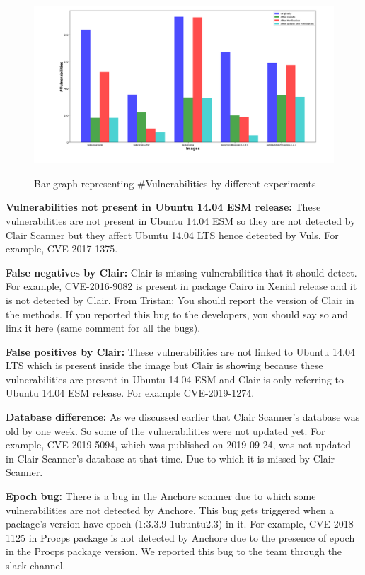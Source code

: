 \documentclass[a4paper,num-refs]{oup-contemporary}
\newcommand{\tristan}[1]{\color{blue}From Tristan: #1\color{black}}
\begin{document}
\begin{figure}[b]
        {\includegraphics[scale=1.5,width=\textwidth]
        {Figures/bargraph.png}}
        \caption{\label{fig:bargraph} Bar graph representing \#Vulnerabilities by different experiments}
      \end{figure}
\textbf{Vulnerabilities not present in Ubuntu 14.04 ESM release:} These vulnerabilities are not present in Ubuntu 14.04 ESM so they 
are not detected by Clair Scanner but they affect Ubuntu 14.04 LTS hence detected by Vuls. For example, CVE-2017-1375.

\textbf{False negatives by Clair:} Clair is missing vulnerabilities that it should detect. For example, CVE-2016-9082 
is present in package Cairo in Xenial release and it is not detected by Clair. \tristan{You should report the version of Clair in 
the methods. If you reported this bug to the developers, you should say so and link it here (same comment for all the bugs).}

\textbf{False positives by Clair:} These vulnerabilities are not linked to Ubuntu 14.04 LTS which is 
present inside the image but Clair is showing because these vulnerabilities are present in Ubuntu 14.04 ESM and 
Clair is only referring to Ubuntu 14.04 ESM release. For example CVE-2019-1274.

\textbf{Database difference:} As we discussed earlier that Clair Scanner's database was old by one week.
                So some of the vulnerabilities were not updated yet. For example, CVE-2019-5094, which
		was published on 2019-09-24, was not 
		updated in Clair Scanner's database at that time. Due to which it is missed by Clair Scanner.


\textbf{Epoch bug:} There is a bug in the Anchore scanner due to which some vulnerabilities are 
		not detected by Anchore. This bug gets triggered when a package’s version have epoch 
		(1:3.3.9-1ubuntu2.3) in it. For example, CVE-2018-1125 in Procps package is not
		detected by Anchore due to the presence of epoch in the Procps package version.
		We reported this bug to the team through the slack channel.
\end{document}
